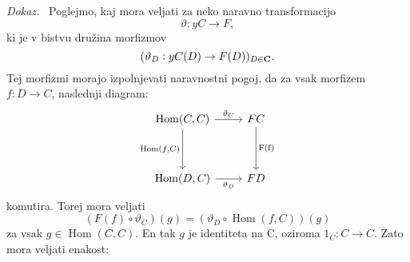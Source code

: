 \documentclass[12pt,a4paper]{book}
\theoremstyle{definition}
\theoremstyle{plain}
\newenvironment{dokaz}{\emph{Dokaz.}\ }{\hspace{\fill}{$\Box$}}
\theoremstyle{definition}
\theoremstyle{remark}
\DeclareMathOperator{\Hom}{Hom}
\begin{document}
\begin{dokaz}
Poglejmo, kaj mora veljati za neko naravno transformacijo
$$\vartheta : yC \to F,$$
ki je v bistvu družina morfizmov 
$$(\vartheta_D : yC(D) \to F(D))_{D \in \bf{C}}.$$
Tej morfizmi morajo izpolnjevati naravnostni pogoj, da za vsak morfizem $f : D \to C$, naslednji diagram:
%
\[ \begin{tikzcd}[row sep=huge]
\Hom(C,C) \arrow[r, "\vartheta_C"] \arrow[d, "{\Hom(f,C)}"'] & FC \arrow[d, "\text{F(f)}"] \\
\Hom(D,C) \arrow[r, "\vartheta_D"'] & FD
\end{tikzcd} \]
komutira. Torej mora veljati 
$$(F(f) \circ \vartheta_C) (g) = (\vartheta_D \circ \Hom(f,C)) (g)$$
za vsak $g \in \Hom(C,C)$. En tak $g$ je identiteta na C, oziroma $1_C : C \to C$. Zato mora veljati enakost:


\end{dokaz}
\end{document}
